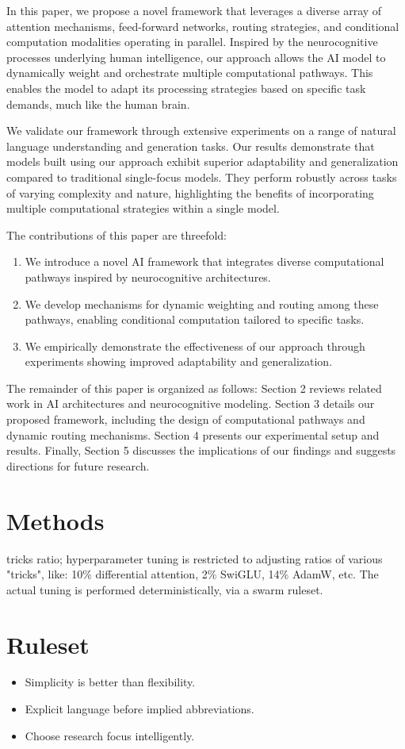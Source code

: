 \documentclass{article}
\begin{document}
In this paper, we propose a novel framework that leverages a diverse array of attention mechanisms, feed-forward networks, routing strategies, and conditional computation modalities operating in parallel. Inspired by the neurocognitive processes underlying human intelligence, our approach allows the AI model to dynamically weight and orchestrate multiple computational pathways. This enables the model to adapt its processing strategies based on specific task demands, much like the human brain.

We validate our framework through extensive experiments on a range of natural language understanding and generation tasks. Our results demonstrate that models built using our approach exhibit superior adaptability and generalization compared to traditional single-focus models. They perform robustly across tasks of varying complexity and nature, highlighting the benefits of incorporating multiple computational strategies within a single model.

The contributions of this paper are threefold:

\begin{enumerate} \item We introduce a novel AI framework that integrates diverse computational pathways inspired by neurocognitive architectures. \item We develop mechanisms for dynamic weighting and routing among these pathways, enabling conditional computation tailored to specific tasks. \item We empirically demonstrate the effectiveness of our approach through experiments showing improved adaptability and generalization. \end{enumerate}

The remainder of this paper is organized as follows: Section 2 reviews related work in AI architectures and neurocognitive modeling. Section 3 details our proposed framework, including the design of computational pathways and dynamic routing mechanisms. Section 4 presents our experimental setup and results. Finally, Section 5 discusses the implications of our findings and suggests directions for future research.

\section{Methods}

tricks ratio; hyperparameter tuning is restricted to adjusting ratios of various "tricks", like: 10\% differential attention, 2\% SwiGLU, 14\% AdamW, etc. The actual tuning is performed deterministically, via a swarm ruleset.

\section{Ruleset}

\begin{itemize}
    \item Simplicity is better than flexibility.
    \item Explicit language before implied abbreviations.
    \item Choose research focus intelligently.
\end{itemize}



\end{document}
